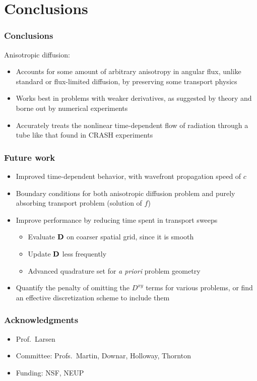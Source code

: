 \documentclass{beamer}
\newcommand{\Dtens}{\mat{D}}
\begin{document}
\section{Conclusions}
\begin{frame}
  \frametitle{Conclusions}
  Anisotropic diffusion:
  \begin{itemize}
    \item Accounts for some amount of arbitrary anisotropy in angular
      flux, unlike standard or flux-limited diffusion, by preserving some
      transport physics
    \item Works best in problems with weaker derivatives, as suggested by
      theory and borne out by numerical experiments
    \item Accurately treats the nonlinear time-dependent flow of radiation
      through a tube like that found in CRASH experiments
  \end{itemize}
\end{frame}
\begin{frame}
  \frametitle{Future work}
  \begin{itemize}
    \item Improved time-dependent behavior, with wavefront propagation speed of
      $c$
    \item Boundary conditions for both anisotropic diffusion problem and
      purely absorbing transport problem (solution of $f$)
    \item Improve performance by reducing time spent in transport sweeps
      \begin{itemize}
        \item Evaluate $\Dtens$ on coarser spatial grid, since it is smooth
        \item Update $\Dtens$ less frequently
        \item Advanced quadrature set for \emph{a priori} problem geometry
      \end{itemize}
    \item Quantify the penalty of omitting the $D^{xy}$ terms for various
      problems, or find an effective discretization scheme to include them
  \end{itemize}
\end{frame}
\appendix
\begin{frame}
  \frametitle{Acknowledgments}
  \begin{itemize}
    \item Prof.~Larsen
    \item Committee: Profs.~Martin, Downar, Holloway, Thornton
    \item Funding: NSF, NEUP
  \end{itemize}
\end{frame}
\end{document}
